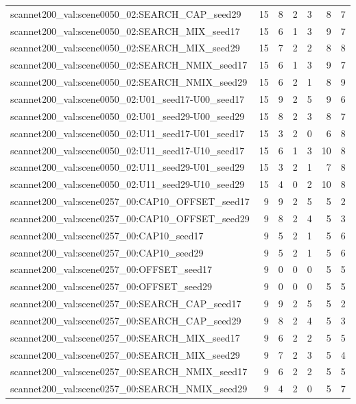 \begin{table}[t]
\begin{tabular}{lrrrrrr}
scannet200\_val:scene0050\_02:SEARCH\_CAP\_seed29 & 15 & 8 & 2 & 3 & 8 & 7 \\
scannet200\_val:scene0050\_02:SEARCH\_MIX\_seed17 & 15 & 6 & 1 & 3 & 9 & 7 \\
scannet200\_val:scene0050\_02:SEARCH\_MIX\_seed29 & 15 & 7 & 2 & 2 & 8 & 8 \\
scannet200\_val:scene0050\_02:SEARCH\_NMIX\_seed17 & 15 & 6 & 1 & 3 & 9 & 7 \\
scannet200\_val:scene0050\_02:SEARCH\_NMIX\_seed29 & 15 & 6 & 2 & 1 & 8 & 9 \\
scannet200\_val:scene0050\_02:U01\_seed17-U00\_seed17 & 15 & 9 & 2 & 5 & 9 & 6 \\
scannet200\_val:scene0050\_02:U01\_seed29-U00\_seed29 & 15 & 8 & 2 & 3 & 8 & 7 \\
scannet200\_val:scene0050\_02:U11\_seed17-U01\_seed17 & 15 & 3 & 2 & 0 & 6 & 8 \\
scannet200\_val:scene0050\_02:U11\_seed17-U10\_seed17 & 15 & 6 & 1 & 3 & 10 & 8 \\
scannet200\_val:scene0050\_02:U11\_seed29-U01\_seed29 & 15 & 3 & 2 & 1 & 7 & 8 \\
scannet200\_val:scene0050\_02:U11\_seed29-U10\_seed29 & 15 & 4 & 0 & 2 & 10 & 8 \\
scannet200\_val:scene0257\_00:CAP10\_OFFSET\_seed17 & 9 & 9 & 2 & 5 & 5 & 2 \\
scannet200\_val:scene0257\_00:CAP10\_OFFSET\_seed29 & 9 & 8 & 2 & 4 & 5 & 3 \\
scannet200\_val:scene0257\_00:CAP10\_seed17 & 9 & 5 & 2 & 1 & 5 & 6 \\
scannet200\_val:scene0257\_00:CAP10\_seed29 & 9 & 5 & 2 & 1 & 5 & 6 \\
scannet200\_val:scene0257\_00:OFFSET\_seed17 & 9 & 0 & 0 & 0 & 5 & 5 \\
scannet200\_val:scene0257\_00:OFFSET\_seed29 & 9 & 0 & 0 & 0 & 5 & 5 \\
scannet200\_val:scene0257\_00:SEARCH\_CAP\_seed17 & 9 & 9 & 2 & 5 & 5 & 2 \\
scannet200\_val:scene0257\_00:SEARCH\_CAP\_seed29 & 9 & 8 & 2 & 4 & 5 & 3 \\
scannet200\_val:scene0257\_00:SEARCH\_MIX\_seed17 & 9 & 6 & 2 & 2 & 5 & 5 \\
scannet200\_val:scene0257\_00:SEARCH\_MIX\_seed29 & 9 & 7 & 2 & 3 & 5 & 4 \\
scannet200\_val:scene0257\_00:SEARCH\_NMIX\_seed17 & 9 & 6 & 2 & 2 & 5 & 5 \\
scannet200\_val:scene0257\_00:SEARCH\_NMIX\_seed29 & 9 & 4 & 2 & 0 & 5 & 7 \\

\end{tabular}
\end{table}
